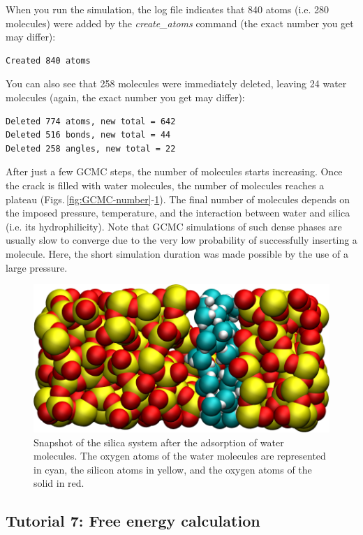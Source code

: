 \documentclass[9pt,tutorial]{livecoms}
\begin{document}
When you run the simulation, the log file indicates that 840 atoms (i.e. 280 molecules)
were added by the \textit{create\_atoms} command (the exact number you get may differ):
{\normalsize \begin{verbatim}
Created 840 atoms
\end{verbatim}}
You can also see that 258 molecules were immediately deleted, leaving 24 water
molecules (again, the exact number you get may differ):
{\normalsize \begin{verbatim}
Deleted 774 atoms, new total = 642
Deleted 516 bonds, new total = 44
Deleted 258 angles, new total = 22
\end{verbatim}}
After just a few GCMC steps, the number of molecules starts increasing. Once the
crack is filled with water molecules, the number of molecules reaches a plateau
(Figs.\,\ref{fig:GCMC-number}-\ref{fig:GCMC-solvated}). The final number of
molecules depends on the imposed pressure, temperature, and the interaction
between water and silica (i.e. its hydrophilicity). Note that GCMC simulations
of such dense phases are usually slow to converge due to the very low probability
of successfully inserting a molecule. Here, the short simulation duration was
made possible by the use of a large pressure.

\begin{figure}
\centering
\includegraphics[width=\linewidth]{GCMC-solvated}
\caption{Snapshot of the silica system after the adsorption of water molecules.
The oxygen atoms of the water molecules are represented in cyan, the silicon
atoms in yellow, and the oxygen atoms of the solid in red.}
\label{fig:GCMC-solvated}
\end{figure}

\subsection{Tutorial 7: Free energy calculation}
\label{umbrella-sampling-label}
\end{document}
